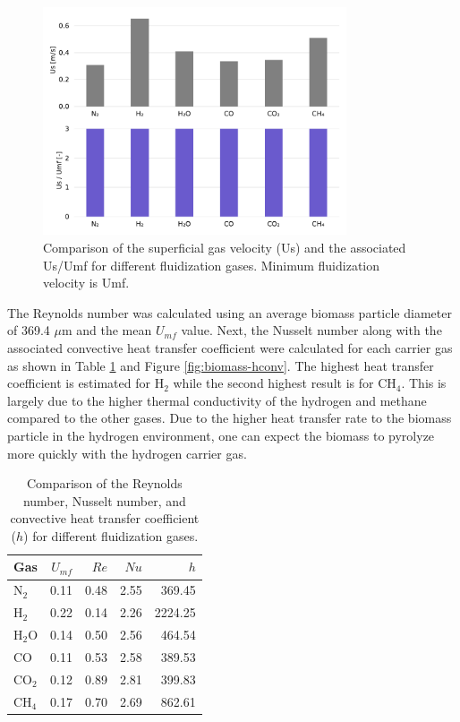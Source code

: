 \begin{figure}[H]
    \centering
    \includegraphics[width=0.8\textwidth]{figures/us-usumf-gases.pdf}
    \caption{Comparison of the superficial gas velocity (Us) and the associated Us/Umf for different fluidization gases. Minimum fluidization velocity is Umf.}
    \label{fig:us-usumf-gases}
\end{figure}

The Reynolds number was calculated using an average biomass particle diameter of 369.4 $\mu$m and the mean $U_{mf}$ value. Next, the Nusselt number along with the associated convective heat transfer coefficient were calculated for each carrier gas as shown in Table \ref{tab:biomass-hconv} and Figure \ref{fig:biomass-hconv}. The highest heat transfer coefficient is estimated for H$_2$ while the second highest result is for CH$_4$. This is largely due to the higher thermal conductivity of the hydrogen and methane compared to the other gases. Due to the higher heat transfer rate to the biomass particle in the hydrogen environment, one can expect the biomass to pyrolyze more quickly with the hydrogen carrier gas.

\begin{table}[H]
    \centering
    \caption{Comparison of the Reynolds number, Nusselt number, and convective heat transfer coefficient ($h$) for different fluidization gases.}
    \label{tab:biomass-hconv}
    \begin{tabular}{lrrrr}
        \toprule
        Gas & $U_{mf}$ & $Re$ & $Nu$ & $h$ \\
        \midrule
        N$_2$  & 0.11 & 0.48 & 2.55 & 369.45  \\
        H$_2$  & 0.22 & 0.14 & 2.26 & 2224.25 \\
        H$_2$O & 0.14 & 0.50 & 2.56 & 464.54  \\
        CO     & 0.11 & 0.53 & 2.58 & 389.53  \\
        CO$_2$ & 0.12 & 0.89 & 2.81 & 399.83  \\
        CH$_4$ & 0.17 & 0.70 & 2.69 & 862.61  \\
        \bottomrule
    \end{tabular}
\end{table}

